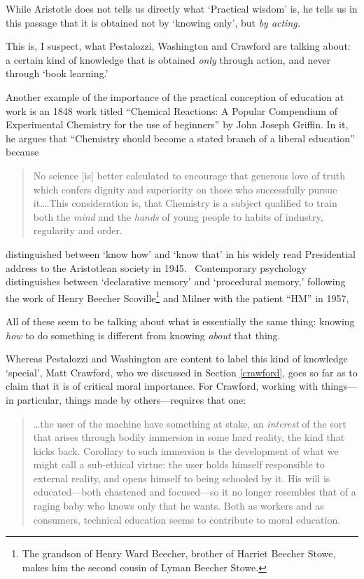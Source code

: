 While Aristotle does not tells us directly what `Practical wisdom' is, he tells us in this passage that it is obtained not by `knowing only', but \emph{by acting.} 

This is, I suspect, what Pestalozzi, Washington and Crawford are talking about: a certain kind of knowledge that is obtained \emph{only} through action, and never through `book learning.' 

Another example of the importance of the practical conception of education at work is an 1848 work titled ``Chemical Reactions: A Popular Compendium of Experimental Chemistry for the use of beginners'' by John Joseph Griffin. In it, he argues that ``Chemistry should become a stated branch of a liberal education'' because 

\begin{quote}

No science [is] better calculated to encourage that generous love of truth which confers dignity and superiority on those who successfully pursue it{\ldots}.This consideration is, that Chemistry is a subject qualified to train both the \emph{mind} and the \emph{hands} of young people to habits of industry, regularity and order. ~\citep[p. 3--4]{Griffin:1860tx}
\end{quote}

 distinguished between `know how' and `know that' in his widely read Presidential address to the Aristotlean society in 1945.~\citep{Ryle:1945fd} Contemporary psychology distinguishes between `declarative memory' and `procedural memory,' following the work of Henry Beecher Scoville\footnote{The grandson of Henry Ward Beecher, brother of Harriet Beecher Stowe, makes him the second cousin of Lyman Beecher Stowe.} and Milner with the patient ``HM'' in 1957,~\citep{Scoville:1957wx}

All of these seem to be talking about what is essentially the same thing: knowing \emph{how} to do something is different from knowing \emph{about} that thing. 

Whereas Pestalozzi and Washington are content to label this kind of knowledge `special', Matt Crawford, who we discussed in Section \ref{crawford}, goes so far as to claim that it is of critical moral importance. For Crawford, working with things---in particular, things made by others---requires that one:

\begin{quote}

{\ldots}the user of the machine have something at stake, an \emph{interest} of the sort that arises through bodily immersion in some hard reality, the kind that kicks back. Corollary to such immersion is the development of what we might call a sub-ethical virtue: the user holds himself responsible to external reality, and opens himself to being schooled by it. His will is educated---both chastened and focused---so it no longer resembles that of a raging baby who knows only that he wants. Both as workers and as consumers, technical education seems to contribute to moral education. ~\citep[p. 60, italics in original]{Crawford:2009tz}
\end{quote}

